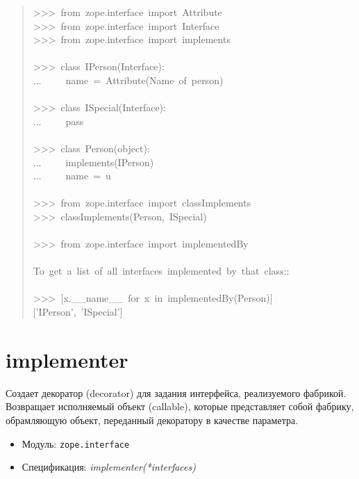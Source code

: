 \documentclass[a4paper,openany,twoside,final]{book}
\providecommand*{\DUroletitlereference}[1]{\textsl{#1}}
\begin{document}
\begin{quote}{\ttfamily \raggedright \noindent
>{}>{}>~from~zope.interface~import~Attribute\\
>{}>{}>~from~zope.interface~import~Interface\\
>{}>{}>~from~zope.interface~import~implements\\
~\\
>{}>{}>~class~IPerson(Interface):\\
...~~~~~name~=~Attribute(\textquotedbl{}Name~of~person\textquotedbl{})\\
~\\
>{}>{}>~class~ISpecial(Interface):\\
...~~~~~pass\\
~\\
>{}>{}>~class~Person(object):\\
...~~~~~implements(IPerson)\\
...~~~~~name~=~u\textquotedbl{}\textquotedbl{}\\
~\\
>{}>{}>~from~zope.interface~import~classImplements\\
>{}>{}>~classImplements(Person,~ISpecial)\\
~\\
>{}>{}>~from~zope.interface~import~implementedBy\\
~\\
To~get~a~list~of~all~interfaces~implemented~by~that~class::\\
~\\
>{}>{}>~{[}x.\_\_name\_\_~for~x~in~implementedBy(Person){]}\\
{[}'IPerson',~'ISpecial'{]}
}
\end{quote}


\section*{implementer%
  \label{implementer}%
}

Создает декоратор (decorator) для задания интерфейса, реализуемого
фабрикой.  Возвращает исполняемый объект (callable), которые
представляет собой фабрику, обрамляющую объект, переданный декоратору
в качестве параметра.

\begin{itemize}

\item Модуль: \texttt{zope.interface}

\item Спецификация: \DUroletitlereference{implementer(*interfaces)}

\end{itemize}
\end{document}
